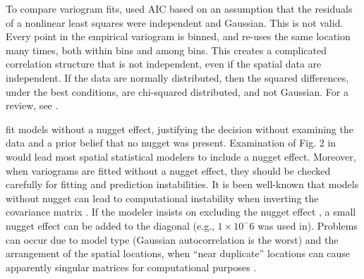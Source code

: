 \documentclass[11pt, titlepage]{article}\usepackage[]{graphicx}\usepackage[]{color}
\begin{document}
\begin{spacing}{1.9}
\begin{flushleft}
To compare variogram fits, \citet{Ladl:Avga:Whea:Boyc:pred:2016} used AIC based on an assumption that the residuals of a nonlinear least squares were independent and Gaussian. This is not valid.  Every point in the empirical variogram is binned, and re-uses the same location many times, both within bins and among bins.  This creates a complicated correlation structure that is not independent, even if the spatial data are independent.  If the data are normally distributed, then the squared differences, under the best conditions, are chi-squared distributed, and not Gaussian.  For a review, see \citet{Cres:stat:1993}.

\citet{Ladl:Avga:Whea:Boyc:pred:2016} fit models without a nugget effect, justifying the decision without examining the data and a prior belief that no nugget was present. Examination of Fig. 2 in \citet{Ladl:Avga:Whea:Boyc:pred:2016} would lead most spatial statistical modelers to include a nugget effect.  Moreover, when variograms are fitted without a nugget effect, they should be checked carefully for fitting and prediction instabilities. It is been well-known that models without nugget can lead to computational instability when inverting the covariance matrix \citep{Diam:Arms:robu:1984,Posa:cond:1989,ODow:cond:1991,Abab:cond:1994}. If the modeler insists on excluding the nugget effect \citep[as often occurs when using kriging to approximate deterministic computer models, e.g.,][]{Mart:Simp:krig:2005}, a small nugget effect can be added to the diagonal (e.g., $1 \times 10^-6$ was used in\citet{Book:Denn:Fran:Sera:etal:rigo:1999}).  Problems can occur due to model type (Gaussian autocorrelation is the worst) and the arrangement of the spatial locations, when ``near duplicate'' locations can cause apparently singular matrices for computational purposes \citep[][p. 220]{Biva:Pebe:Gome:appl:2008}.


\end{flushleft}
\end{spacing}
\end{document}
